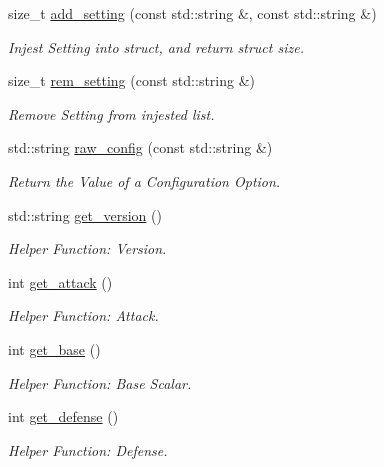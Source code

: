\begin{DoxyCompactItemize}
size\+\_\+t \mbox{\hyperlink{classConfigManager_a20f7cccf9a79f3c95a493660d4ba5919}{add\+\_\+setting}} (const std\+::string \&, const std\+::string \&)
\begin{DoxyCompactList}\small\item\em Injest Setting into struct, and return struct size. \end{DoxyCompactList}\item 
size\+\_\+t \mbox{\hyperlink{classConfigManager_afa581faf4c9329722a807cdb49e14381}{rem\+\_\+setting}} (const std\+::string \&)
\begin{DoxyCompactList}\small\item\em Remove Setting from injested list. \end{DoxyCompactList}\item 
std\+::string \mbox{\hyperlink{classConfigManager_a2dac3f46c52eb3c53843abca84a74793}{raw\+\_\+config}} (const std\+::string \&)
\begin{DoxyCompactList}\small\item\em Return the Value of a Configuration Option. \end{DoxyCompactList}\item 
std\+::string \mbox{\hyperlink{classConfigManager_a7b6225b85d5d0766069cdcaf5e05186c}{get\+\_\+version}} ()
\begin{DoxyCompactList}\small\item\em Helper Function\+: Version. \end{DoxyCompactList}\item 
int \mbox{\hyperlink{classConfigManager_a328ee1b9545e093db2f7569a4022b476}{get\+\_\+attack}} ()
\begin{DoxyCompactList}\small\item\em Helper Function\+: Attack. \end{DoxyCompactList}\item 
int \mbox{\hyperlink{classConfigManager_a57b0095138267495fa6da6c2147bf70e}{get\+\_\+base}} ()
\begin{DoxyCompactList}\small\item\em Helper Function\+: Base Scalar. \end{DoxyCompactList}\item 
int \mbox{\hyperlink{classConfigManager_a7da8012593610ab3558103a5f8e0a3cb}{get\+\_\+defense}} ()
\begin{DoxyCompactList}\small\item\em Helper Function\+: Defense. \end{DoxyCompactList}\item 

\end{DoxyCompactItemize}
